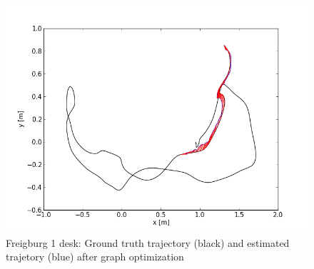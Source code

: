 \begin{figure}[h!]
\begin{center}
\includegraphics[scale=0.75]{images/freiburg1_desk_1_100_optimized.png}
\caption{Freigburg 1 desk: Ground truth trajectory (black) and estimated trajetory (blue) after graph optimization}
\label{fig:jan}
\end{center}
\end{figure}
